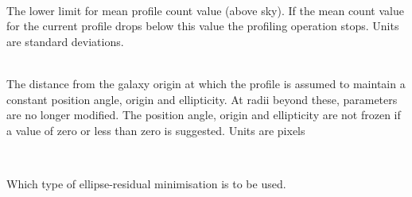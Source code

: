 \documentclass[twoside,11pt]{article}
\newcommand{\sstsubsection}[1]{ \item[{#1}] \mbox{} \\}
\newcommand{\sstsubsection}[1]{\item[{#1}]}
\begin{document}
{{{      }
      \sstsubsection{
         LIM2=\_REAL (Read)
      }{
         The lower limit for mean profile count value (above sky).
         If the mean count value for the current profile drops below
         this value the profiling operation stops. Units
         are standard deviations.
      }
      \sstsubsection{
         LIM3=\_REAL (Read)
      }{
         The distance from the galaxy origin at which the profile is
         assumed to maintain a constant position angle, origin and
         ellipticity. At radii beyond these, parameters are no longer
         modified. The position angle, origin and ellipticity are not
         frozen if a value of zero or less than zero is suggested.
         Units are pixels
      }
      \sstsubsection{
         MINMOD=\_INTEGER (Read)
      }{
         Which type of ellipse-residual minimisation is to be used.

}}}
\end{document}
